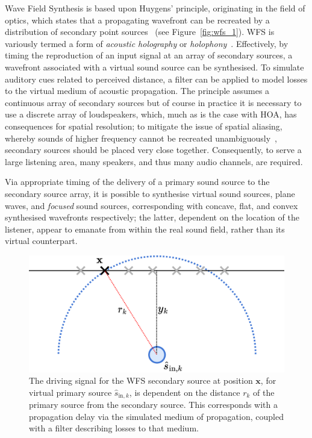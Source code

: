 \documentclass[utf8]{FrontiersinHarvard}
\newcommand{\figref}[1]{Figure~\ref{#1}}
\newcommand{\bfx}{\mathbf{x}}
\newcommand{\sigink}{\hat{s}_{\text{in},k}}
\begin{document}
    Wave Field Synthesis is based upon Huygens' principle, originating in the
    field of optics, which states that a propagating wavefront can be recreated
    by a distribution of secondary point sources~\citep{mueller_acoustic_1971,
        berkhout_acoustic_1993,belloch_performance_2021} (see
    \figref{fig:wfs_1}).
    WFS is variously termed a form of \textit{acoustic holography} or
    \textit{holophony}~\citep{berkhout_holographic_1988,ahrens_analytic_2012}.
    Effectively, by timing the reproduction of an input signal at an array of
    secondary sources, a wavefront associated with a virtual sound source can be
    synthesised.
    To simulate auditory cues related to perceived distance, a filter can be
    applied to model losses to the virtual medium of acoustic propagation.
    The principle assumes a continuous array of secondary sources but of course
    in practice it is necessary to use a discrete array of loudspeakers, which,
    much as is the case with HOA, has consequences for spatial resolution;
    to mitigate the issue of spatial aliasing, whereby sounds of higher
    frequency cannot be recreated unambiguously~\citep{winter_geometric_2018},
    secondary sources should be placed very close together.
    Consequently, to serve a large listening area, many speakers, and thus many
    audio channels, are required.

    Via appropriate timing of the delivery of a primary sound source to the
    secondary source array, it is possible to synthesise virtual sound sources,
    plane waves, and \textit{focused} sound sources, corresponding with concave,
    flat, and convex synthesised wavefronts respectively; the latter, dependent
    on the location of the listener, appear to emanate from within the real
    sound field, rather than its virtual counterpart.

    \begin{figure}[ht]
        \centering
        \includegraphics[width=.75\textwidth]{figures/wfs_2}
        \caption{
            The driving signal for the WFS secondary source at position $\bfx$,
            for virtual primary source $\sigink$, is dependent on the distance
            $r_k$ of the primary source from the secondary source.
            This corresponds with a propagation delay via the simulated medium of
            propagation, coupled with a filter describing losses to that medium.
        }
        \label{fig:wfs_2}
    \end{figure}
\end{document}
